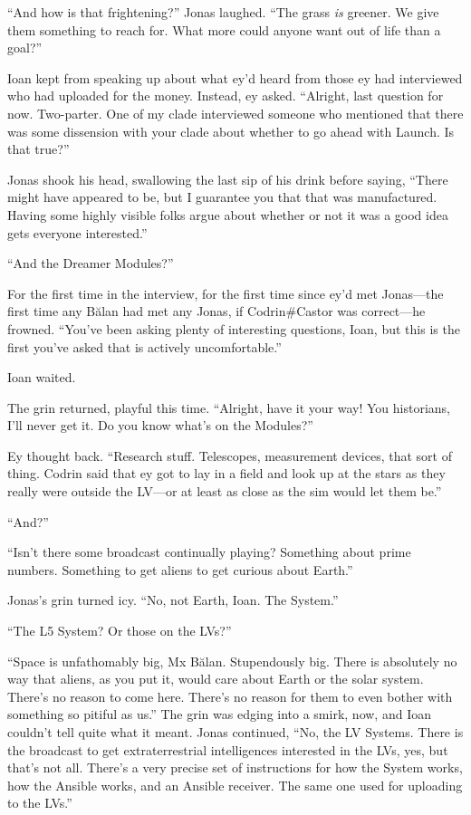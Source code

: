 ``And how is that frightening?'' Jonas laughed. ``The grass \emph{is} greener. We give them something to reach for. What more could anyone want out of life than a goal?''

Ioan kept from speaking up about what ey'd heard from those ey had interviewed who had uploaded for the money. Instead, ey asked. ``Alright, last question for now. Two-parter. One of my clade interviewed someone who mentioned that there was some dissension with your clade about whether to go ahead with Launch. Is that true?''

Jonas shook his head, swallowing the last sip of his drink before saying, ``There might have appeared to be, but I guarantee you that that was manufactured. Having some highly visible folks argue about whether or not it was a good idea gets everyone interested.''

``And the Dreamer Modules?''

For the first time in the interview, for the first time since ey'd met Jonas---the first time any Bălan had met any Jonas, if Codrin\#Castor was correct---he frowned. ``You've been asking plenty of interesting questions, Ioan, but this is the first you've asked that is actively uncomfortable.''

Ioan waited.

The grin returned, playful this time. ``Alright, have it your way! You historians, I'll never get it. Do you know what's on the Modules?''

Ey thought back. ``Research stuff. Telescopes, measurement devices, that sort of thing. Codrin said that ey got to lay in a field and look up at the stars as they really were outside the LV---or at least as close as the sim would let them be.''

``And?''

``Isn't there some broadcast continually playing? Something about prime numbers. Something to get aliens to get curious about Earth.''

Jonas's grin turned icy. ``No, not Earth, Ioan. The System.''

``The L5 System? Or those on the LVs?''

``Space is unfathomably big, Mx Bălan. Stupendously big. There is absolutely no way that aliens, as you put it, would care about Earth or the solar system. There's no reason to come here. There's no reason for them to even bother with something so pitiful as us.'' The grin was edging into a smirk, now, and Ioan couldn't tell quite what it meant. Jonas continued, ``No, the LV Systems. There is the broadcast to get extraterrestrial intelligences interested in the LVs, yes, but that's not all. There's a very precise set of instructions for how the System works, how the Ansible works, and an Ansible receiver. The same one used for uploading to the LVs.''

